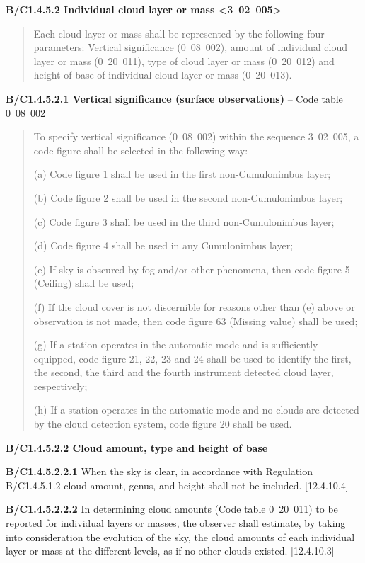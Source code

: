 \textbf{B/C1.4.5.2 Individual cloud layer or mass \textless3~02~005\textgreater{}}

\begin{quote}
Each cloud layer or mass shall be represented by the following four parameters: Vertical significance (0~08~002), amount of individual cloud layer or mass (0~20~011), type of cloud layer or mass (0~20~012) and height of base of individual cloud layer or mass (0~20~013).
\end{quote}

\textbf{B/C1.4.5.2.1 Vertical significance (surface observations)} -- Code table 0~08~002

\begin{quote}
To specify vertical significance (0~08~002) within the sequence 3~02~005, a code figure shall be selected in the following way:

(a) Code figure 1 shall be used in the first non-Cumulonimbus layer;

(b) Code figure 2 shall be used in the second non-Cumulonimbus layer;

(c) Code figure 3 shall be used in the third non-Cumulonimbus layer;

(d) Code figure 4 shall be used in any Cumulonimbus layer;

(e) If sky is obscured by fog and/or other phenomena, then code figure 5 (Ceiling) shall be used;

(f) If the cloud cover is not discernible for reasons other than (e) above or observation is not made, then code figure 63 (Missing value) shall be used;

(g) If a station operates in the automatic mode and is sufficiently equipped, code figure 21, 22, 23 and 24 shall be used to identify the first, the second, the third and the fourth instrument detected cloud layer, respectively;

(h) If a station operates in the automatic mode and no clouds are detected by the cloud detection system, code figure 20 shall be used.
\end{quote}

\textbf{B/C1.4.5.2.2 Cloud amount, type and height of base}

\textbf{B/C1.4.5.2.2.1} When the sky is clear, in accordance with Regulation B/C1.4.5.1.2 cloud amount, genus, and height shall not be included. {[}12.4.10.4{]}

\textbf{B/C1.4.5.2.2.2} In determining cloud amounts (Code table 0~20~011) to be reported for individual layers or masses, the observer shall estimate, by taking into consideration the evolution of the sky, the cloud amounts of each individual layer or mass at the different levels, as if no other clouds existed. {[}12.4.10.3{]}

